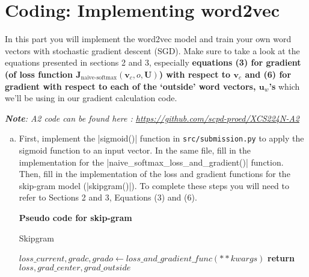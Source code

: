 \section{Coding: Implementing word2vec}
In this part you will implement the word2vec model and train your own word vectors with stochastic gradient descent (SGD). Make sure to take a look at the equations presented in sections 2 and 3, especially \textbf{equations (3) for gradient (of loss function $\bm J_{\text{naive-softmax}}(\bm v_c, o, \bm U)$) with respect to $\bm v_c$ and (6) for gradient with respect to each of the `outside' word vectors, $\bm u_w$'s} which we'll be using in our gradient calculation code. 

\textit{\textbf{Note}: A2 code can be found here : \url{https://github.com/scpd-proed/XCS224N-A2}}

\begin{enumerate}[(a)]
    \item {} First, implement the |sigmoid()| function in \texttt{src/submission.py} to apply the sigmoid function to an input vector. In the same file, fill in the implementation for the |naive\_softmax\_loss\_and\_gradient()| function. Then, fill in the implementation of the loss and gradient functions for the skip-gram model (|skipgram()|).\newline
    To complete these steps you will need to refer to Sections 2 and 3, Equations (3) and (6).\newline
    
    \textbf{Pseudo code for skip-gram}
    
    \begin{algorithm}
    \caption{Skipgram}
    \begin{algorithmic}
        
        
            \State $loss\_current, gradc, grado \gets loss\_and\_gradient\_func(**kwargs)$
                    \EndFor
    \State \textbf{return} $loss, grad\_center, grad\_outside$\EndProcedure
    \end{algorithmic}
    \end{algorithm}


\end{enumerate}
